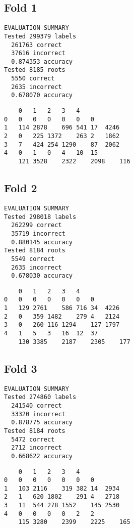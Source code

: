 \documentclass{sig-alternate}
\begin{document}
\subsection*{Fold 1}
\begin{lstlisting}
EVALUATION SUMMARY
Tested 299379 labels
  261763 correct
  37616 incorrect
  0.874353 accuracy
Tested 8185 roots
  5550 correct
  2635 incorrect
  0.678070 accuracy
\end{lstlisting}
\begin{lstlisting}
	0	1	2	3	4
0	0	0	0	0	0	0
1	114	2878	696	541	17	4246
2	0	225	1372	263	2	1862
3	7	424	254	1290	87	2062
4	0	1	0	4	10	15
	121	3528	2322	2098	116
\end{lstlisting}
\subsection*{Fold 2}
\begin{lstlisting}
EVALUATION SUMMARY
Tested 298018 labels
  262299 correct
  35719 incorrect
  0.880145 accuracy
Tested 8184 roots
  5549 correct
  2635 incorrect
  0.678030 accuracy
\end{lstlisting}
\begin{lstlisting}
	0	1	2	3	4	
0	0	0	0	0	0	0
1	129	2761	586	716	34	4226
2	0	359	1482	279	4	2124
3	0	260	116	1294	127	1797
4	1	5	3	16	12	37
	130	3385	2187	2305	177
\end{lstlisting}
\subsection*{Fold 3}
\begin{lstlisting}
EVALUATION SUMMARY
Tested 274860 labels
  241540 correct
  33320 incorrect
  0.878775 accuracy
Tested 8184 roots
  5472 correct
  2712 incorrect
  0.668622 accuracy
\end{lstlisting}
\begin{lstlisting}
	0	1	2	3	4	
0	0	0	0	0	0	0
1	103	2116	319	382	14	2934
2	1	620	1802	291	4	2718
3	11	544	278	1552	145	2530
4	0	0	0	0	2	2
	115	3280	2399	2225	165

\end{lstlisting}

\balancecolumns %
\end{document}
